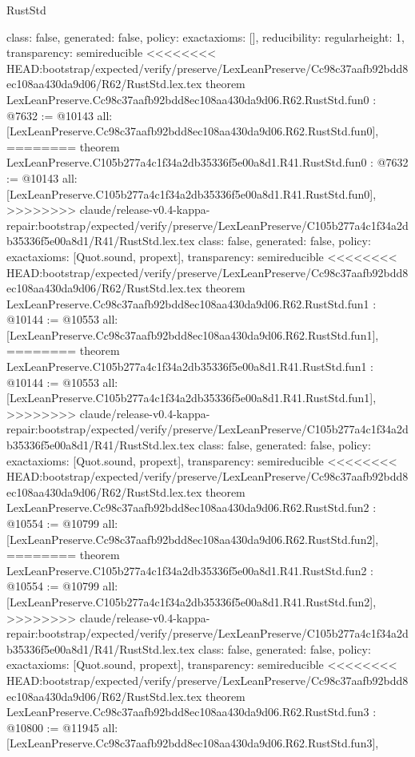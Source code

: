 \begin{lexlean}{RustStd}
\begin{coremodule}
{\begin{coremodule}
{{{  class: false,
  generated: false,
  policy: exact{axioms: []},
  reducibility: regular{height: 1},
  transparency: semireducible
}
<<<<<<<< HEAD:bootstrap/expected/verify/preserve/LexLeanPreserve/Cc98c37aafb92bdd8ec108aa430da9d06/R62/RustStd.lex.tex
theorem LexLeanPreserve.Cc98c37aafb92bdd8ec108aa430da9d06.R62.RustStd.fun0 : @7632 := @10143 {
  all: [LexLeanPreserve.Cc98c37aafb92bdd8ec108aa430da9d06.R62.RustStd.fun0],
========
theorem LexLeanPreserve.C105b277a4c1f34a2db35336f5e00a8d1.R41.RustStd.fun0 : @7632 := @10143 {
  all: [LexLeanPreserve.C105b277a4c1f34a2db35336f5e00a8d1.R41.RustStd.fun0],
>>>>>>>> claude/release-v0.4-kappa-repair:bootstrap/expected/verify/preserve/LexLeanPreserve/C105b277a4c1f34a2db35336f5e00a8d1/R41/RustStd.lex.tex
  class: false,
  generated: false,
  policy: exact{axioms: [Quot.sound, propext]},
  transparency: semireducible
}
<<<<<<<< HEAD:bootstrap/expected/verify/preserve/LexLeanPreserve/Cc98c37aafb92bdd8ec108aa430da9d06/R62/RustStd.lex.tex
theorem LexLeanPreserve.Cc98c37aafb92bdd8ec108aa430da9d06.R62.RustStd.fun1 : @10144 := @10553 {
  all: [LexLeanPreserve.Cc98c37aafb92bdd8ec108aa430da9d06.R62.RustStd.fun1],
========
theorem LexLeanPreserve.C105b277a4c1f34a2db35336f5e00a8d1.R41.RustStd.fun1 : @10144 := @10553 {
  all: [LexLeanPreserve.C105b277a4c1f34a2db35336f5e00a8d1.R41.RustStd.fun1],
>>>>>>>> claude/release-v0.4-kappa-repair:bootstrap/expected/verify/preserve/LexLeanPreserve/C105b277a4c1f34a2db35336f5e00a8d1/R41/RustStd.lex.tex
  class: false,
  generated: false,
  policy: exact{axioms: [Quot.sound, propext]},
  transparency: semireducible
}
<<<<<<<< HEAD:bootstrap/expected/verify/preserve/LexLeanPreserve/Cc98c37aafb92bdd8ec108aa430da9d06/R62/RustStd.lex.tex
theorem LexLeanPreserve.Cc98c37aafb92bdd8ec108aa430da9d06.R62.RustStd.fun2 : @10554 := @10799 {
  all: [LexLeanPreserve.Cc98c37aafb92bdd8ec108aa430da9d06.R62.RustStd.fun2],
========
theorem LexLeanPreserve.C105b277a4c1f34a2db35336f5e00a8d1.R41.RustStd.fun2 : @10554 := @10799 {
  all: [LexLeanPreserve.C105b277a4c1f34a2db35336f5e00a8d1.R41.RustStd.fun2],
>>>>>>>> claude/release-v0.4-kappa-repair:bootstrap/expected/verify/preserve/LexLeanPreserve/C105b277a4c1f34a2db35336f5e00a8d1/R41/RustStd.lex.tex
  class: false,
  generated: false,
  policy: exact{axioms: [Quot.sound, propext]},
  transparency: semireducible
}
<<<<<<<< HEAD:bootstrap/expected/verify/preserve/LexLeanPreserve/Cc98c37aafb92bdd8ec108aa430da9d06/R62/RustStd.lex.tex
theorem LexLeanPreserve.Cc98c37aafb92bdd8ec108aa430da9d06.R62.RustStd.fun3 : @10800 := @11945 {
  all: [LexLeanPreserve.Cc98c37aafb92bdd8ec108aa430da9d06.R62.RustStd.fun3],
}}}}}}
\end{coremodule}}
\end{coremodule}
\end{lexlean}
